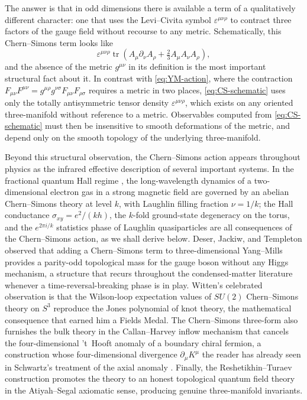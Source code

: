 \documentclass[11pt]{article}
\newcommand{\tr}{\operatorname{tr}}
\theoremstyle{definition}
\numberwithin{theorem}{section}
\numberwithin{equation}{section}
\let\del\partial
\begin{document}
\noindent The answer is that in odd dimensions there is available a term of a qualitatively different character: one that uses the Levi--Civita symbol $\varepsilon^{\mu\nu\rho}$ to contract three factors of the gauge field without recourse to any metric. Schematically, this Chern--Simons term looks like
\begin{equation}\label{eq:CS-schematic}
\varepsilon^{\mu\nu\rho}\tr\left(A_\mu \del_\nu A_\rho + \tfrac{2}{3}A_\mu A_\nu A_\rho\right),
\end{equation}
and the absence of the metric $g^{\mu\nu}$ in its definition is the most important structural fact about it. In contrast with \eqref{eq:YM-action}, where the contraction $F_{\mu\nu}F^{\mu\nu} = g^{\mu\rho}g^{\nu\sigma}F_{\mu\nu}F_{\rho\sigma}$ requires a metric in two places, \eqref{eq:CS-schematic} uses only the totally antisymmetric tensor density $\varepsilon^{\mu\nu\rho}$, which exists on any oriented three-manifold without reference to a metric. Observables computed from \eqref{eq:CS-schematic} must then be insensitive to smooth deformations of the metric, and depend only on the smooth topology of the underlying three-manifold.

\medskip

\noindent Beyond this structural observation, the Chern--Simons action appears throughout physics as the infrared effective description of several important systems. In the fractional quantum Hall regime \cite{Tong2016QHE}, the long-wavelength dynamics of a two-dimensional electron gas in a strong magnetic field are governed by an abelian Chern--Simons theory at level $k$, with Laughlin filling fraction $\nu = 1/k$; the Hall conductance $\sigma_{xy} = e^2/(kh)$, the $k$-fold ground-state degeneracy on the torus, and the $e^{2\pi i/k}$ statistics phase of Laughlin quasiparticles are all consequences of the Chern--Simons action, as we shall derive below. Deser, Jackiw, and Templeton observed \cite{DeserJackiwTempleton1982} that adding a Chern--Simons term to three-dimensional Yang--Mills provides a parity-odd topological mass for the gauge boson without any Higgs mechanism, a structure that recurs throughout the condensed-matter literature whenever a time-reversal-breaking phase is in play. Witten's celebrated observation \cite{Witten1989Jones} is that the Wilson-loop expectation values of $SU(2)$ Chern--Simons theory on $S^3$ reproduce the Jones polynomial of knot theory, the mathematical consequence that earned him a Fields Medal. The Chern--Simons three-form also furnishes the bulk theory in the Callan--Harvey \cite{CallanHarvey1985} inflow mechanism that cancels the four-dimensional 't~Hooft anomaly of a boundary chiral fermion, a construction whose four-dimensional divergence $\del_\mu K^\mu$ the reader has already seen in Schwartz's treatment of the axial anomaly \cite{Schwartz2014QFT}. Finally, the Reshetikhin--Turaev construction \cite{ReshetikhinTuraev1991} promotes the theory to an honest topological quantum field theory in the Atiyah--Segal axiomatic sense, producing genuine three-manifold invariants.
\end{document}
